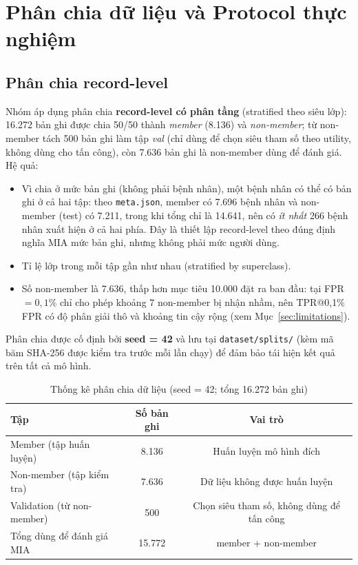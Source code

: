 \documentclass[12pt,a4paper]{report}
\begin{document}
\section{Phân chia dữ liệu và Protocol thực nghiệm}

\subsection{Phân chia record-level}

Nhóm áp dụng phân chia \textbf{record-level có phân tầng} (stratified theo siêu lớp): 16.272 bản ghi được chia 50/50 thành \textit{member} (8.136) và \textit{non-member}; từ non-member tách 500 bản ghi làm tập \textit{val} (chỉ dùng để chọn siêu tham số theo utility, không dùng cho tấn công), còn 7.636 bản ghi là non-member dùng để đánh giá. Hệ quả:
\begin{itemize}
  \item Vì chia ở mức bản ghi (không phải bệnh nhân), một bệnh nhân có thể có bản ghi ở cả hai tập: theo \texttt{meta.json}, member có 7.696 bệnh nhân và non-member (test) có 7.211, trong khi tổng chỉ là 14.641, nên có \textit{ít nhất} 266 bệnh nhân xuất hiện ở cả hai phía. Đây là thiết lập record-level theo đúng định nghĩa MIA mức bản ghi, nhưng không phải mức người dùng.
  \item Tỉ lệ lớp trong mỗi tập gần như nhau (stratified by superclass).
  \item Số non-member là 7.636, thấp hơn mục tiêu 10.000 đặt ra ban đầu: tại FPR $= 0{,}1\%$ chỉ cho phép khoảng $7$ non-member bị nhận nhầm, nên TPR@0,1\% FPR có độ phân giải thô và khoảng tin cậy rộng (xem Mục~\ref{sec:limitations}).
\end{itemize}

Phân chia được cố định bởi \textbf{seed = 42} và lưu tại \texttt{dataset/splits/} (kèm mã băm SHA-256 được kiểm tra trước mỗi lần chạy) để đảm bảo tái hiện kết quả trên tất cả mô hình.

\begin{table}[H]
\centering
\caption{Thống kê phân chia dữ liệu (seed = 42; tổng 16.272 bản ghi)}
\label{tab:split}
\begin{tabular}{lcc}
\toprule
\textbf{Tập} & \textbf{Số bản ghi} & \textbf{Vai trò} \\
\midrule
Member (tập huấn luyện)     & 8.136  & Huấn luyện mô hình đích \\
Non-member (tập kiểm tra)   & 7.636  & Dữ liệu không được huấn luyện \\
Validation (từ non-member)  & 500    & Chọn siêu tham số, không dùng để tấn công \\
\midrule
Tổng dùng để đánh giá MIA   & 15.772 & member + non-member \\
\bottomrule
\end{tabular}
\end{table}
\end{document}
